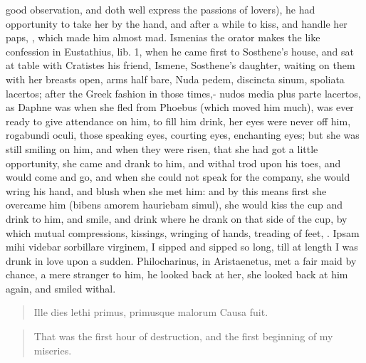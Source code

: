 good observation, and doth well express the passions of lovers), he had
opportunity to take her by the hand, and after a while to kiss, and
handle her paps, \etc{},  which made him almost mad. Ismenias the
orator makes the like confession in Eustathius, lib. 1, when he came
first to Sosthene's house, and sat at table with Cratistes his friend,
Ismene, Sosthene's daughter, waiting on them with her breasts open,
arms half bare, Nuda pedem, discincta sinum, spoliata lacertos;
after the Greek fashion in those times,- nudos media plus parte
lacertos, as Daphne was when she fled from Phoebus (which moved him
much), was ever ready to give attendance on him, to fill him drink, her
eyes were never off him, rogabundi oculi, those speaking eyes, courting
eyes, enchanting eyes; but she was still smiling on him, and when they
were risen, that she had got a little opportunity, she came and
drank to him, and withal trod upon his toes, and would come and go, and
when she could not speak for the company, she would wring his hand, and
blush when she met him: and by this means first she overcame him
(bibens amorem hauriebam simul), she would kiss the cup and drink to
him, and smile, and drink where he drank on that side of the cup, by
which mutual compressions, kissings, wringing of hands, treading of
feet, \etc{}. Ipsam mihi videbar sorbillare virginem, I sipped and sipped
so long, till at length I was drunk in love upon a sudden.
Philocharinus, in  Aristaenetus, met a fair maid by chance, a
mere stranger to him, he looked back at her, she looked back at him
again, and smiled withal.

\begin{latin}
\begin{verse}%
Ille dies lethi primus, primusque malorum
Causa fuit.
\end{verse}%
\end{latin}
\translationrule%
\begin{verse}%
That was the first hour of destruction,
and the first beginning of my miseries.
\end{verse}%

